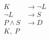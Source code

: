 \documentclass[preview,border=4pt]{standalone}
\begin{document}
\[
\begin{aligned}
        K &\rightarrow \neg L\\
        \neg L &\rightarrow S\\
        P \land S &\rightarrow D\\
        K,\;P
      \end{aligned}
\]
\end{document}
